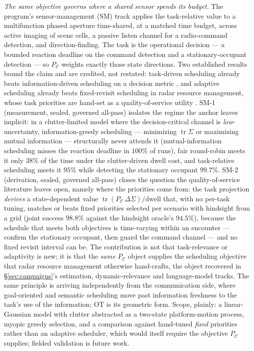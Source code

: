 \documentclass[letterpaper,onecolumn]{IEEEtran}
\theoremstyle{definition}
\theoremstyle{remark}
\newcommand{\PC}{P_{\mathcal{C}}}
\newcommand{\tr}{\operatorname{tr}}
\newcommand{\Sig}{\Sigma}
\begin{document}
\emph{The same objective governs where a shared sensor spends its
budget.} The program's sensor-management (SM) track applies the
task-relative value to a multifunction phased aperture time-shared,
at a matched time budget, across active imaging of scene cells, a passive
listen channel for a radio-command detection, and direction-finding. The
task is the operational decision --- a bounded reaction deadline on
the command detection and a stationary-occupant detection --- so $\PC$
weights exactly those state directions. Two established results bound the
claim and are credited, not restated: task-driven scheduling already
beats information-driven scheduling on a decision metric
\cite{kreucher2005}, and adaptive scheduling already beats fixed-revisit
scheduling in radar resource management, whose task priorities are
hand-set as a quality-of-service utility \cite{rajkumar1997}. SM-1
(measurement, sealed, governed all-pass) isolates the regime the anchor
leaves implicit: in a clutter-limited model where the decision-critical
channel is \emph{low}-uncertainty, information-greedy scheduling ---
minimizing $\tr\Sig$ or maximizing mutual information --- structurally
never attends it (mutual-information scheduling misses the reaction
deadline in $100\%$ of runs), fair round-robin meets it only $38\%$ of
the time under the clutter-driven dwell cost, and task-relative
scheduling meets it $95\%$ while detecting the stationary occupant
$99.7\%$. SM-2 (derivation, sealed, governed all-pass) closes the
question the quality-of-service literature leaves open, namely where the
priorities come from: the task projection \emph{derives} a
state-dependent value $\tr(\PC\,\Delta\Sig)/\mathrm{dwell}$ that, with no
per-task tuning, matches or beats fixed priorities selected per scenario
with hindsight from a grid (joint success $\mathbf{98.8\%}$ against the
hindsight oracle's $94.5\%$), because the schedule that meets both
objectives is time-varying within an encounter --- confirm the stationary
occupant, then guard the command channel --- and no fixed revisit
interval can be. The contribution is not that task-relevance or
adaptivity is new; it is that the \emph{same} $\PC$ object supplies the
scheduling objective that radar resource management otherwise
hand-crafts, the object recovered in \S\ref{sec:campaigns}'s estimation,
dynamic-relevance and language-model tracks. The same principle is
arriving independently from the communication side, where goal-oriented
and semantic scheduling move past information freshness to the task's
use of the information; OT is its geometric form. Scope, plainly: a
linear-Gaussian model with clutter abstracted as a two-state
platform-motion process, myopic greedy selection, and a comparison
against hand-tuned \emph{fixed} priorities rather than an adaptive
scheduler, which would itself require the objective $\PC$ supplies;
fielded validation is future work.
\end{document}
